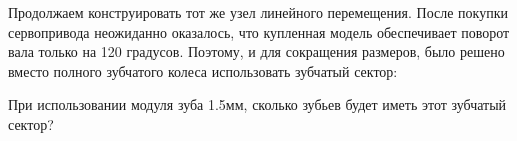 
Продолжаем конструировать тот же узел линейного перемещения.   После покупки сервопривода неожиданно оказалось, что купленная модель обеспечивает поворот вала только на 120 градусов.  Поэтому, и для сокращения размеров, было решено вместо полного зубчатого колеса использовать зубчатый сектор:


При использовании модуля зуба 1.5мм,  сколько зубьев будет иметь этот зубчатый сектор?